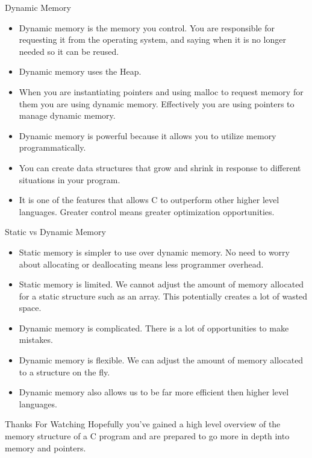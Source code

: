 \documentclass{beamer}
\begin{document}
\begin{frame}{Dynamic Memory}
	\begin{itemize}[<+->]
	\item Dynamic memory is the memory you control. You are responsible for requesting it from the operating system, and saying when it is no longer needed so it can be reused.
	\item Dynamic memory uses the Heap.
	\item When you are instantiating pointers and using malloc to request memory for them you are using dynamic memory. Effectively you are using pointers to manage dynamic memory.
	\item Dynamic memory is powerful because it allows you to utilize memory programmatically.
	\item You can create data structures that grow and shrink in response to different situations in your program.
	\item It is one of the features that allows C to outperform other higher level languages. Greater control means greater optimization opportunities.
	\end{itemize}
\end{frame}

\begin{frame}{Static vs Dynamic Memory}
	\begin{itemize}[<+->]
		\item Static memory is simpler to use over dynamic memory. No need to worry about allocating or deallocating means less programmer overhead.
		\item Static memory is limited. We cannot adjust the amount of memory allocated for a static structure such as an array. This potentially creates a lot of wasted space.
		\item Dynamic memory is complicated. There is a lot of opportunities to make mistakes.
		\item Dynamic memory is flexible. We can adjust the amount of memory allocated to a structure on the fly. 
		\item Dynamic memory also allows us to be far more efficient then higher level languages.
	\end{itemize}
\end{frame}

\begin{frame}{Thanks For Watching}
	Hopefully you've gained a high level overview of the memory structure of a C program and are prepared to go more in depth into memory and pointers. 
\end{frame}
\end{document}

